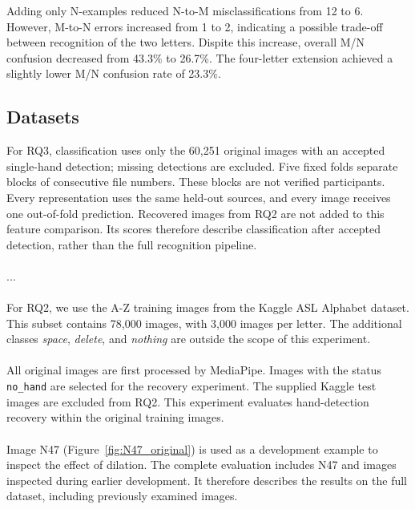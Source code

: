 \documentclass{article}
\begin{document}
Adding only N-examples reduced N-to-M misclassifications from 12 to 6. However, M-to-N errors increased from 1 to 2, indicating a possible trade-off between recognition of the two letters. Dispite this increase, overall M/N confusion decreased from 43.3\% to 26.7\%. The four-letter extension achieved a slightly lower M/N confusion rate of 23.3\%.
    \subsection{Datasets}

For RQ3, classification uses only the 60,251 original images with an accepted single-hand detection; missing detections are excluded. Five fixed folds separate blocks of consecutive file numbers. These blocks are not verified participants. Every representation uses the same held-out sources, and every image receives one out-of-fold prediction. Recovered images from RQ2 are not added to this feature comparison. Its scores therefore describe classification after accepted detection, rather than the full recognition pipeline.
\leavevmode 
        \\\\
        ...
        \\\\
        
        For RQ2, we use the A-Z training images from the Kaggle ASL Alphabet dataset. This subset contains 78,000 images, with 3,000 images per letter. The additional classes \textit{space}, \textit{delete}, and \textit{nothing} are outside the scope of this experiment.
        \\\\
        All original images are first processed by MediaPipe. Images with the status \texttt{no\_hand} are selected for the recovery experiment. The supplied Kaggle test images are excluded from RQ2. This experiment evaluates hand-detection recovery within the original training images.
        \\\\
        Image N47 (Figure~\ref{fig:N47_original}) is used as a development example to inspect the effect of dilation. The complete evaluation includes N47 and images inspected during earlier development. It therefore describes the results on the full dataset, including previously examined images.
        
\end{document}
